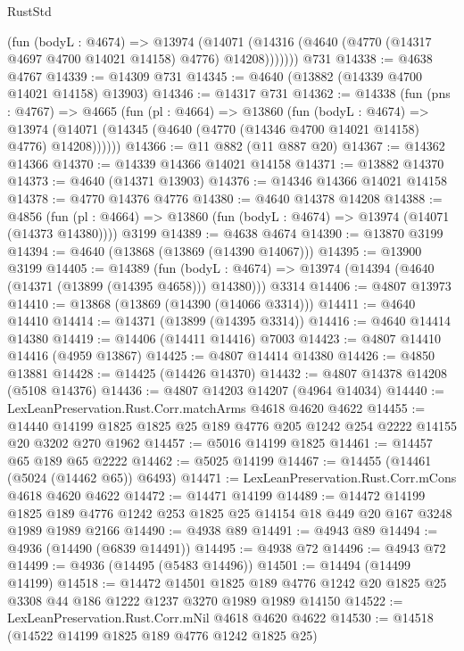 \begin{lexlean}{RustStd}
\begin{coremodule}
          (fun (bodyL : @4674) =>
          @13974
            (@14071 (@14316 (@4640 (@4770 (@14317 @4697 @4700 @14021 @14158) @4776) @14208)))))))
    @731
@14338 := @4638 @4767
@14339 := @14309 @731
@14345 := @4640 (@13882 (@14339 @4700 @14021 @14158) @13903)
@14346 := @14317 @731
@14362 := @14338
    (fun (pns : @4767) =>
    @4665
      (fun (pl : @4664) =>
      @13860
        (fun (bodyL : @4674) =>
        @13974 (@14071 (@14345 (@4640 (@4770 (@14346 @4700 @14021 @14158) @4776) @14208))))))
@14366 := @11 @882 (@11 @887 @20)
@14367 := @14362 @14366
@14370 := @14339 @14366 @14021 @14158
@14371 := @13882 @14370
@14373 := @4640 (@14371 @13903)
@14376 := @14346 @14366 @14021 @14158
@14378 := @4770 @14376 @4776
@14380 := @4640 @14378 @14208
@14388 := @4856
    (fun (pl : @4664) => @13860 (fun (bodyL : @4674) => @13974 (@14071 (@14373 @14380))))
    @3199
@14389 := @4638 @4674
@14390 := @13870 @3199
@14394 := @4640 (@13868 (@13869 (@14390 @14067)))
@14395 := @13900 @3199
@14405 := @14389
    (fun (bodyL : @4674) => @13974 (@14394 (@4640 (@14371 (@13899 (@14395 @4658))) @14380)))
    @3314
@14406 := @4807 @13973
@14410 := @13868 (@13869 (@14390 (@14066 @3314)))
@14411 := @4640 @14410
@14414 := @14371 (@13899 (@14395 @3314))
@14416 := @4640 @14414 @14380
@14419 := @14406 (@14411 @14416) @7003
@14423 := @4807 @14410 @14416 (@4959 @13867)
@14425 := @4807 @14414 @14380
@14426 := @4850 @13881
@14428 := @14425 (@14426 @14370)
@14432 := @4807 @14378 @14208 (@5108 @14376)
@14436 := @4807 @14203 @14207 (@4964 @14034)
@14440 := LexLeanPreservation.Rust.Corr.matchArms @4618 @4620 @4622
@14455 := @14440 @14199 @1825 @1825 @25 @189 @4776 @205 @1242 @254 @2222 @14155 @20 @3202 @270 @1962
@14457 := @5016 @14199 @1825
@14461 := @14457 @65 @189 @65 @2222
@14462 := @5025 @14199
@14467 := @14455 (@14461 (@5024 (@14462 @65)) @6493)
@14471 := LexLeanPreservation.Rust.Corr.mCons @4618 @4620 @4622
@14472 := @14471 @14199
@14489 := @14472
    @14199
    @1825
    @189
    @4776
    @1242
    @253
    @1825
    @25
    @14154
    @18
    @449
    @20
    @167
    @3248
    @1989
    @1989
    @2166
@14490 := @4938 @89
@14491 := @4943 @89
@14494 := @4936 (@14490 (@6839 @14491))
@14495 := @4938 @72
@14496 := @4943 @72
@14499 := @4936 (@14495 (@5483 @14496))
@14501 := @14494 (@14499 @14199)
@14518 := @14472
    @14501
    @1825
    @189
    @4776
    @1242
    @20
    @1825
    @25
    @3308
    @44
    @186
    @1222
    @1237
    @3270
    @1989
    @1989
    @14150
@14522 := LexLeanPreservation.Rust.Corr.mNil @4618 @4620 @4622
@14530 := @14518 (@14522 @14199 @1825 @189 @4776 @1242 @1825 @25)

\end{coremodule}
\end{lexlean}
